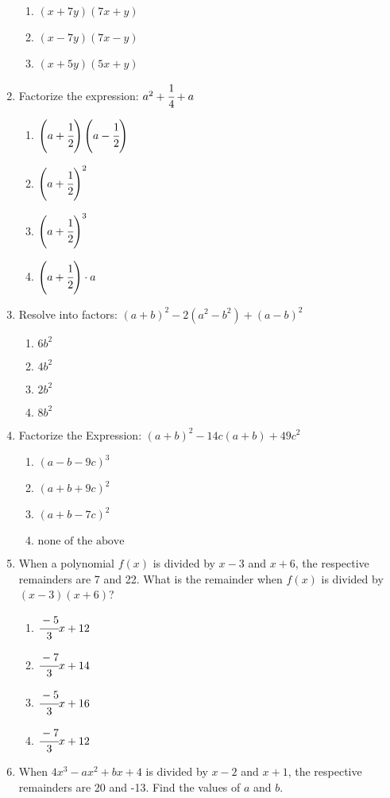 \begin{multicols}{2}
\begin{enumerate}[label={\arabic*.}]
\begin{enumerate}[label={\Alph*.}]
	\item \((x+7y)(7x + y)\)
	\item \((x-7y)(7x-y)\)
	\item \((x+5y)(5x + y)\)
	\end{enumerate}
\item Factorize the expression: $a^2 + \cfrac{1}{4} + a$
\begin{multicols}{2}
	\begin{enumerate}[label={\Alph*.}]
	\item \(\left(a+ \cfrac{1}{2}\right) \left(a - \cfrac{1}{2}\right) \)
	\item \(\left(a+ \cfrac{1}{2}\right)^2\)
	\item \(\left(a+\cfrac{1}{2}\right)^3\)
	\item \(\left(a+ \cfrac{1}{2}\right)\cdot a\)
\end{enumerate}
\end{multicols}
\item Resolve into factors: $(a+b)^2 - 2(a^2 - b^2) + (a-b)^2$
	\begin{enumerate}[label={\Alph*.}]
	\item \(6b^2\)
	\item \(4b^2\)
	\item \(2b^2\)
	\item \(8b^2\)
	\end{enumerate}
\item Factorize the Expression: $(a+b)^2 - 14c(a+b) + 49c^2$
	\begin{enumerate}[label={\Alph*.}]
	\item \((a-b-9c)^3\)
	\item \((a+b+9c)^2\)
	\item \((a+b-7c)^2\)
	\item \(\text{none of the above}\)
	\end{enumerate}
\item When a polynomial $f(x)$ is divided by $x-3$ and $x+6$, the respective remainders are 7 and 22. What is the remainder when $f(x)$ is divided by $(x-3)(x+6)$?
	\begin{enumerate}[label={\Alph*.}]
	\item \(\cfrac{-5}{3}x + 12\)
	\item \(\cfrac{-7}{3}x + 14\)
	\item \(\cfrac{-5}{3}x + 16\)
	\item \(\cfrac{-7}{3}x + 12\)
	\end{enumerate}
\item When $4x^3 - ax^2 + bx + 4$ is divided by $x-2$ and $x+1$, the respective remainders are 20 and -13. Find the values of $a$ and $b$.

\end{enumerate}
\end{multicols}
